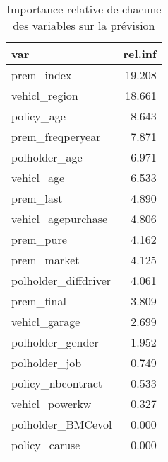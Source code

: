 \begin{table}[ht]
\centering
\caption{Importance relative de chacune des variables sur la prévision}
\label{tbl:iml-gbm}
\begin{tabular}{lr}
  \hline
var & rel.inf \\ 
  \hline
prem\_index & 19.208 \\ 
  vehicl\_region & 18.661 \\ 
  policy\_age & 8.643 \\ 
  prem\_freqperyear & 7.871 \\ 
  polholder\_age & 6.971 \\ 
  vehicl\_age & 6.533 \\ 
  prem\_last & 4.890 \\ 
  vehicl\_agepurchase & 4.806 \\ 
  prem\_pure & 4.162 \\ 
  prem\_market & 4.125 \\ 
  polholder\_diffdriver & 4.061 \\ 
  prem\_final & 3.809 \\ 
  vehicl\_garage & 2.699 \\ 
  polholder\_gender & 1.952 \\ 
  polholder\_job & 0.749 \\ 
  policy\_nbcontract & 0.533 \\ 
  vehicl\_powerkw & 0.327 \\ 
  polholder\_BMCevol & 0.000 \\ 
  policy\_caruse & 0.000 \\ 
   \hline
\end{tabular}
\end{table}

